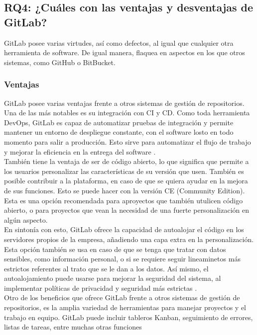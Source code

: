 \documentclass[runningheads]{llncs}
\begin{document}
\subsection{RQ4: ¿Cuáles con las ventajas y desventajas de GitLab?}
GitLab posee varias virtudes, así como defectos, al igual que cualquier otra herramienta de software. De igual manera, flaquea en aspectos
en los que otros sistemas, como GitHub o BitBucket.
\subsubsection{Ventajas}
GitLab posee varias ventajas frente a otros sistemas de gestión de repositorios. Una de las más notables es su integración con CI y CD. Como
toda herramienta DevOps, GitLab es capaz de automatizar pruebas de integración y permite mantener un entorno de despliegue constante, con el
software losto en todo momento para salir a producción. Esto sirve para automatizar el flujo de trabajo y mejorar la eficiencia en la entrega
del software \cite{uddin2023comparative}.\\
También tiene la ventaja de ser de código abierto, lo que significa que permite a los usuarios personalizar las características de su versión
que usen. También es posible contribuir a la plataforma, en caso de que se quiera ayudar en la mejora de sus funciones. Esto se puede hacer con
la versión CE (Community Edition). Esta es una opción recomendada para aproyectos que también utulicen código abierto, o para proyectos
que vean la necesidad de una fuerte personalización en algún aspecto.\\
En sintonía con esto, GitLab ofrece la capacidad de autoalojar el código en los servidores propios de la empresa, añadiendo una capa extra en la
personalización. Esta opción también se usa en caso de que se tenga que tratar con datos sensibles, como información personal, o si se requiere
seguir lineaminetos más estrictos referentes al trato que se le dan a los datos. Así mismo, el autoalojamiento puede usarse para mejorar la seguridad
del sistema, al implementar políticas de privacidad y seguridad más estrictas \cite{safari2020analysis}.\\
Otro de los beneficios que ofrece GitLab frente a otros sistemas de gestión de repositorios, es la amplia variedad de herramientas para manejar
proyectos y el trabajo en equipo. GitLab puede incluir tableros Kanban, seguimiento de errores, listas de tareas, entre muchas otras funciones
\end{document}
